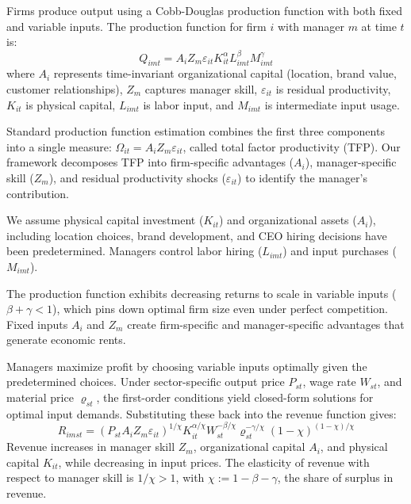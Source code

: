 \documentclass[11pt,a4paper]{article}
\begin{document}
Firms produce output using a Cobb-Douglas production function with both fixed and variable inputs. The production function for firm $i$ with manager $m$ at time $t$ is:
\begin{equation}\label{eq:production}
Q_{imt} = A_i Z_{m} \varepsilon_{it} K_{it}^\alpha L_{imt}^{\beta} M_{imt}^{\gamma}
\end{equation}
where $A_i$ represents time-invariant organizational capital (location, brand value, customer relationships), $Z_m$ captures manager skill, $\varepsilon_{it}$ is residual productivity, $K_{it}$ is physical capital, $L_{imt}$ is labor input, and $M_{imt}$ is intermediate input usage. 

Standard production function estimation combines the first three components into a single measure: $\Omega_{it} = A_i Z_m \varepsilon_{it}$, called total factor productivity (TFP). Our framework decomposes TFP into firm-specific advantages ($A_i$), manager-specific skill ($Z_m$), and residual productivity shocks ($\varepsilon_{it}$) to identify the manager's contribution.

We assume physical capital investment ($K_{it}$) and organizational assets ($A_i$), including location choices, brand development, and CEO hiring decisions have been predetermined. Managers control labor hiring ($L_{imt}$) and input purchases ($M_{imt}$). 

The production function exhibits decreasing returns to scale in variable inputs ($\beta + \gamma < 1$), which pins down optimal firm size even under perfect competition. Fixed inputs $A_i$ and $Z_m$ create firm-specific and manager-specific advantages that generate economic rents.

Managers maximize profit by choosing variable inputs optimally given the predetermined choices. Under sector-specific output price $P_{st}$, wage rate $W_{st}$, and material price $\varrho_{st}$, the first-order conditions yield closed-form solutions for optimal input demands. Substituting these back into the revenue function gives:
\begin{equation}\label{eq:revenue}
R_{imst} = (P_{st}A_i Z_m \varepsilon_{it})^{1/\chi}
K_{it}^{\alpha/\chi}
W_{st}^{-\beta/\chi}
\varrho_{st}^{-\gamma/\chi}
(1-\chi)^{(1-\chi)/\chi}
\end{equation}
Revenue increases in manager skill $Z_m$, organizational capital $A_i$, and physical capital $K_{it}$, while decreasing in input prices. The elasticity of revenue with respect to manager skill is $1/\chi > 1$, with $\chi := 1 - \beta - \gamma$, the share of surplus in revenue. 
\end{document}
